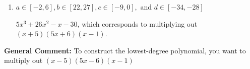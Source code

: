 \documentclass{extbook}[14pt]
\begin{document}
\begin{enumerate}
{\begin{enumerate}[label=\Alph*.]
$5x^{3} +36 x^{2} +61 x + 30$, which corresponds to multiplying out $(x + 5)(5x + 6)(x + 1)$.
\item \( a \in [-2, 6], b \in [22, 27], c \in [-9, 0], \text{ and } d \in [-34, -28] \)

$5x^{3} +26 x^{2} -x -30$, which corresponds to multiplying out $(x + 5)(5x + 6)(x -1)$.
\end{enumerate}

\textbf{General Comment:} To construct the lowest-degree polynomial, you want to multiply out $(x -5)(5x -6)(x -1)$
}
\end{enumerate}
\end{document}
